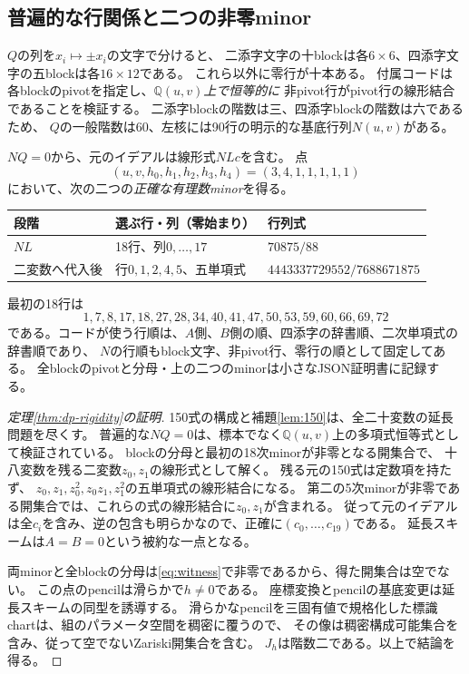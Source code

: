 \documentclass[a4paper,11pt]{ltjsarticle}
\theoremstyle{definition}
\theoremstyle{definition}\newtheorem{definition}[theorem]{定義}
\theoremstyle{remark}\newtheorem{remark}[theorem]{注意}
\begin{document}
\subsection{普遍的な行関係と二つの非零minor}
$Q$の列を$x_i\mapsto\pm x_i$の文字で分けると、
二添字文字の十blockは各$6\times6$、四添字文字の五blockは各$16\times12$である。
これら以外に零行が十本ある。
付属コードは各blockのpivotを指定し、\emph{$\mathbb Q(u,v)$上で恒等的に}
非pivot行がpivot行の線形結合であることを検証する。
二添字blockの階数は三、四添字blockの階数は六であるため、
$Q$の一般階数は60、左核には90行の明示的な基底行列$N(u,v)$がある。

$NQ=0$から、元のイデアルは線形式$NLc$を含む。
点
\begin{equation}
 (u,v,h_0,h_1,h_2,h_3,h_4)=(3,4,1,1,1,1,1)             \label{eq:witness}
\end{equation}
において、次の二つの\emph{正確な有理数minor}を得る。
\begin{center}
\begin{tabular}{lll}\toprule
段階&選ぶ行・列（零始まり）&行列式\\\midrule
$NL$&18行、列$0,\ldots,17$&$70875/88$\\
二変数へ代入後&行$0,1,2,4,5$、五単項式&$4443337729552/7688671875$\\\bottomrule
\end{tabular}
\end{center}
最初の18行は
\[
1,7,8,17,18,27,28,34,40,41,47,50,53,59,60,66,69,72
\]
である。コードが使う行順は、$A$側、$B$側の順、四添字の辞書順、二次単項式の辞書順であり、
$N$の行順もblock文字、非pivot行、零行の順として固定してある。
全blockのpivotと分母・上の二つのminorは小さなJSON証明書に記録する。

\begin{proof}[定理\ref{thm:dp-rigidity}の証明]
150式の構成と補題\ref{lem:150}は、全二十変数の延長問題を尽くす。
普遍的な$NQ=0$は、標本でなく$\mathbb Q(u,v)$上の多項式恒等式として検証されている。
blockの分母と最初の18次minorが非零となる開集合で、
十八変数を残る二変数$z_0,z_1$の線形式として解く。
残る元の150式は定数項を持たず、
$z_0,z_1,z_0^2,z_0z_1,z_1^2$の五単項式の線形結合になる。
第二の5次minorが非零である開集合では、これらの式の線形結合に$z_0,z_1$が含まれる。
従って元のイデアルは全$c_i$を含み、逆の包含も明らかなので、正確に$(c_0,\ldots,c_{19})$である。
延長スキームは$A=B=0$という被約な一点となる。

両minorと全blockの分母は\eqref{eq:witness}で非零であるから、得た開集合は空でない。
この点のpencilは滑らかで$h\ne0$である。
座標変換とpencilの基底変更は延長スキームの同型を誘導する。
滑らかなpencilを三固有値で規格化した標識chartは、組のパラメータ空間を稠密に覆うので、
その像は稠密構成可能集合を含み、従って空でないZariski開集合を含む。
$J_h$は階数二である。以上で結論を得る。
\end{proof}
\end{document}
